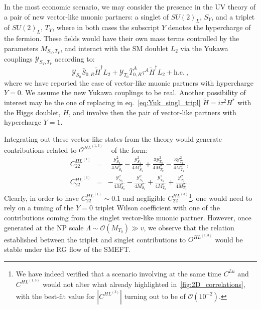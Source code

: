 In the most economic scenario, we may consider the presence in the UV theory of a pair of new vector-like muonic partners: a singlet of $SU(2)_{L}$, $S_{Y}$, and a triplet of $SU(2)_{L}$, $T_{Y}$, 
where in both cases the subscript $Y$ denotes the hypercharge of the fermion.
These fields would have their own mass terms controlled by the parameters $M_{S_{Y},T_{Y}}$, and interact with the SM doublet $L_{2}$ via the Yukawa couplings $\mathcal{Y}_{S_{Y},T_{Y}}$ according to:
\begin{equation}
	\label{eq:Yuk_singl_tripl}
	\mathcal{Y}_{S_{0}} \bar{S}_{0,R} \tilde{H}^{\dagger} L_{2} + \mathcal{Y}_{T_{0}} \bar{T}^{A}_{0,R} \tau^{A} \tilde{H}^{\dagger} L_{2} + \textrm{h.c.}  \ ,
\end{equation} 
where we have reported the case of vector-like muonic partners with hypercharge $Y=0$. We assume the new Yukawa couplings to be real. Another possibility of interest may be the one of replacing in eq.~\eqref{eq:Yuk_singl_tripl} $\tilde{H} = i \tau^{2} H^*$
with the Higgs doublet, $H$, and involve then the pair of vector-like partners with hypercharge $Y=1$. 

Integrating out these vector-like states from the theory would generate contributions related to $\mathcal{O}^{HL^{(1,3)}}$ ~\cite{delAguila:2008pw,Kannike:2011ng} of the form:
\begin{eqnarray} 
	\label{eq:matching_CHL}
	C^{HL^{(1)}}_{22 } & = &
	\ \ \frac{ \mathcal{Y}^{2}_{S_{0}}}{4 M_{S_{0}}^2} 
	- \frac{ \mathcal{Y}^{2}_{S_{1}}}{4 M_{S_{1}}^2}
	+ \frac{ 3 \mathcal{Y}^{2}_{T_{0}}}{4 M_{T_{0}}^2}
	- \frac{ 3 \mathcal{Y}^{2}_{T_{1}}}{4 M_{T_{1}}^2} \ , \\
	C^{HL^{(3)}}_{22} & = & 
	- \frac{ \mathcal{Y}^{2}_{S_{0}}}{4 M_{S_{0}}^2}
	- \frac{ \mathcal{Y}^{2}_{S_{1}}}{4 M_{S_{1}}^2}
	+ \frac{ \mathcal{Y}^{2}_{T_{0}}}{4 M_{T_{0}}^2}
	+ \frac{ \mathcal{Y}^{2}_{T_{1}}}{4 M_{T_{1}}^2} \ . \nonumber
\end{eqnarray}
Clearly, in order to have $C^{HL^{(1)}}_{22} \sim 0.1$ and negligible $C^{HL^{(3)}}_{22}$\footnote{We have indeed verified that a scenario involving at the same time $C^{Lu}$ and $C^{HL^{(1,3)}}$ would not alter what already highlighted in~\autoref{fig:2D_correlations}, with the best-fit value for $|C^{HL^{(3)}}|$ turning out to be of $\mathcal{O}(10^{-2})$.}, 
one would need to rely on a tuning of the $Y=0$ triplet Wilson coefficient with one of the contributions coming from the singlet vector-like muonic partner. However, once generated at the NP scale $\Lambda \sim \mathcal{O}(M_{T_{0}}) \gg v$, we observe that the relation established between the triplet and singlet contributions to $O^{HL^{(1,3)}}$ would be stable under the RG flow of the SMEFT.

